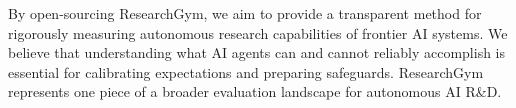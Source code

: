\documentclass[11pt]{article}
\theoremstyle{plain}
\theoremstyle{definition}
\theoremstyle{remark}
\begin{document}
By open-sourcing ResearchGym, we aim to provide a transparent method for rigorously measuring autonomous research capabilities of frontier AI systems. We believe that understanding what AI agents can and cannot reliably accomplish is essential for calibrating expectations and preparing safeguards. ResearchGym represents one piece of a broader evaluation landscape for autonomous AI R\&D.


% 



\newpage
\appendix
\onecolumn





\end{document}
